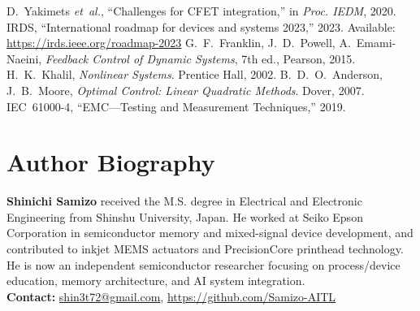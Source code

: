 \documentclass[conference]{IEEEtran}
\begin{document}
\begin{thebibliography}{6}
D.~Yakimets \emph{et~al.}, ``Challenges for CFET integration,'' in \emph{Proc. IEDM}, 2020.
IRDS, ``International roadmap for devices and systems 2023,'' 2023. Available: \url{https://irds.ieee.org/roadmap-2023}
G.~F.~Franklin, J.~D.~Powell, A.~Emami-Naeini, \emph{Feedback Control of Dynamic Systems}, 7th ed., Pearson, 2015.
H.~K.~Khalil, \emph{Nonlinear Systems}. Prentice Hall, 2002.
B.~D.~O.~Anderson, J.~B.~Moore, \emph{Optimal Control: Linear Quadratic Methods}. Dover, 2007.
IEC~61000-4, ``EMC—Testing and Measurement Techniques,'' 2019.
\end{thebibliography}

\section*{Author Biography}
\noindent\textbf{Shinichi Samizo} received the M.S. degree in Electrical and Electronic Engineering from Shinshu University, Japan. He worked at Seiko Epson Corporation in semiconductor memory and mixed-signal device development, and contributed to inkjet MEMS actuators and PrecisionCore printhead technology. He is now an independent semiconductor researcher focusing on process/device education, memory architecture, and AI system integration.\\[2pt]
\textbf{Contact:} \href{mailto:shin3t72@gmail.com}{shin3t72@gmail.com}, \url{https://github.com/Samizo-AITL}

\clearpage
\end{document}
